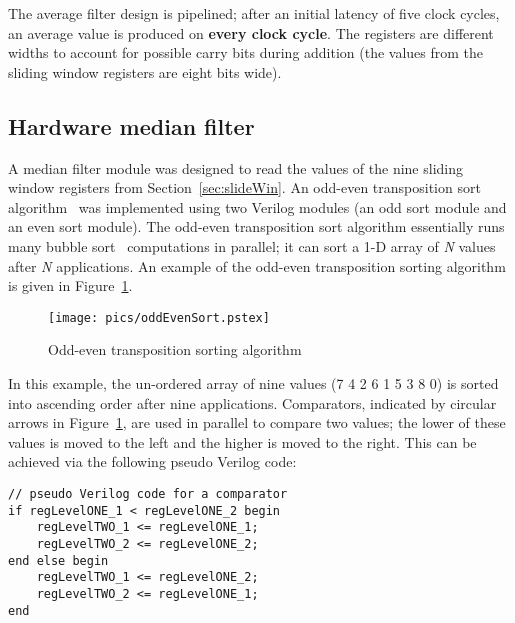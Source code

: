 \documentclass[10pt,twocolumn,letterpaper]{article}
\begin{document}
The average filter design is pipelined; after an initial latency of five clock cycles, an average value is produced on
{\bf every clock cycle}. The registers are different widths to account for possible carry bits during addition (the values
from the sliding window registers are eight bits wide). 

\subsection{Hardware median filter}
\label{sec:med}
A median filter module was designed to read the values of the nine sliding window registers from Section~\ref{sec:slideWin}.
An odd-even transposition sort algorithm~\cite{oddEvenTran} was implemented using two Verilog modules (an odd sort module and an even sort module). 
The odd-even transposition sort algorithm essentially runs many bubble sort~\cite{bubblebk} computations in parallel; it can
sort a 1-D array of \emph{N} values after \emph{N} applications.
An example of the odd-even transposition sorting algorithm is given in Figure~\ref{fig:oddEvenSort}. 
\begin{figure}[!htb]
\begin{center}
\setlength{\abovecaptionskip}{-0.25cm}
        \texttt{[image: pics/oddEvenSort.pstex]}
        \caption{Odd-even transposition sorting algorithm}
        \label{fig:oddEvenSort}
\setlength{\abovecaptionskip}{0cm}
\end{center}
\end{figure}
In this example, the un-ordered array of nine values (7 4 2 6 1 5 3 8 0) is sorted into ascending order after nine applications.
Comparators, indicated by circular arrows in Figure~\ref{fig:oddEvenSort}, are used in parallel to compare two values; the lower of
these values is moved to the left and the higher is moved to the right.
This can be achieved via the following pseudo Verilog code:

\scriptsize
\begin{verbatim}
// pseudo Verilog code for a comparator
if regLevelONE_1 < regLevelONE_2 begin 
    regLevelTWO_1 <= regLevelONE_1;
    regLevelTWO_2 <= regLevelONE_2;
end else begin
    regLevelTWO_1 <= regLevelONE_2;
    regLevelTWO_2 <= regLevelONE_1;
end
\end{verbatim}
\normalsize
\end{document}
